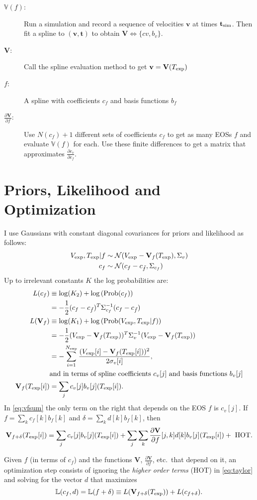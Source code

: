 \documentclass[11pt]{article}
\newcommand{\normal}[2]{{\cal N}(#1,#2)}
\newcommand{\normalexp}[3]{ -\frac{1}{2}
      (#1 - #2)^T #3^{-1} (#1 - #2) }
\newcommand{\fnom}{\tilde f}
\newcommand{\Prob}{\text{Prob}}
\newcommand{\partiald}[2]{\frac{\partial #1}{\partial #2}}
\newcommand\bv{\mathbf{v}}
\newcommand\bt{\mathbf{t}}
\newcommand\Vfunc{\mathbb{V}}
\newcommand\Vt{\mathbf{V}}
\newcommand\vexp{V_{\rm{exp}}}
\newcommand\texp{T_{\rm{exp}}}
\newcommand\cf{c_f}
\newcommand\cv{c_v}
\newcommand\fbasis{b_f}
\newcommand\vbasis{b_v}
\newcommand\tsim{{\mathbf t}_{\rm{sim}}}
\newcommand\DVDf{\partiald{\Vt}{f}}
\newcommand\Lbb{\mathbb{L}}
\begin{document}
\begin{description}
\item[$\Vfunc(f)$:] Run a simulation and record a sequence of
  velocities $\bv$ at times $\tsim$.  Then fit a
  spline to $(\bv, \bt)$ to obtain $\Vt\iff \{cv,\vbasis\}$.
\item[$\Vt$:] Call the spline evaluation method to get $\bv = \Vt(\texp)$
\item[$f$:] A spline with coefficients $\cf$ and basis functions
  $\fbasis$
\item[$\DVDf$:] Use $N(\cf)+1$ different sets of coefficients $\cf$ to
  get as many EOSs $f$ and evaluate $\Vfunc(f)$ for each.  Use these
  finite differences to get a matrix that approximates
  $\partiald{\cv}{\cf}$.
\end{description}

\section{Priors, Likelihood and Optimization}
\label{sec:opt}

I use Gaussians with constant diagonal covariances for priors and
likelihood as follows:
\begin{align}
\vexp,\texp | f &\sim \normal{\vexp-\Vt_f(\texp)}{\Sigma_v} \\
\cf &\sim \normal{\cf - c_{\fnom}}{\Sigma_{\cf}}
\end{align}
Up to irrelevant constants $K$ the log probabilities are:
\begin{align}
  L(\cf) & \equiv \log(K_2) + \log \left(\Prob(\cf) \right)\\
  & = \normalexp{\cf}{c_{\fnom}}{\Sigma_{\cf}}\\
  L(\Vt_f) & \equiv \log(K_1) + \log \left(\Prob(\vexp,\texp | f) \right)
  \nonumber \\
  & = \normalexp{\vexp}{\Vt_f(\texp)}{\Sigma_v} \\
  &= -\sum_{i=1}^{N_{\rm exp}} \frac{(\vexp[i] -
    \Vt_f(\texp[i]))^2}{2\sigma_v[i]}, \\
  & \text{and in terms of spline coefficients }\cv[j]\text{ and basis
    functions } \vbasis[j]\\
  \label{eq:vfsum}
  \Vt_f(\texp[i]) &= \sum_j \cv[j]\vbasis[j](\texp[i]).
\end{align}
In \eqref{eq:vfsum} the only term on the right that depends on the EOS
$f$ is $\cv[j]$.  If $f=\sum_k \cf[k] \fbasis[k]$ and $\delta=\sum_k d[k]
\fbasis[k]$, then
\begin{equation}
  \label{eq:taylor}
  \Vt_{f+\delta}(\texp[i]) = \sum_j \cv[j]\vbasis[j](\texp[i]) +
  \sum_j \sum_k \DVDf[j,k]d[k]\vbasis[j](\texp[i]) +\text{ HOT}.
\end{equation}

Given $f$ (in terms of $\cf$) and the functions $\Vt$, $\DVDf$, etc.\
that depend on it, an optimization step consists of ignoring the
\emph{higher order terms} (HOT) in \eqref{eq:taylor} and solving for
the vector $d$ that maximizes
\begin{equation}
  \label{eq:L}
  \Lbb(\cf,d) = \Lbb(f+\delta) \equiv L(\Vt_{f+\delta}(\texp)) +
  L(c_{f+\delta}).
\end{equation}
\end{document}
